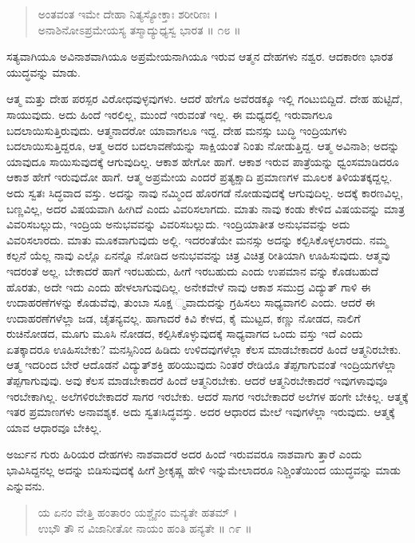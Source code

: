 \begin{verse}
ಅಂತವಂತ ಇಮೇ ದೇಹಾ ನಿತ್ಯಸ್ಯೋಕ್ತಾಃ ಶರೀರಿಣಃ ।\\ಅನಾಶಿನೋಽಪ್ರಮೇಯಸ್ಯ ತಸ್ಮಾದ್ಯುಧ್ಯಸ್ವ ಭಾರತ \num{॥ ೧೮ ॥}
\end{verse}

{\small ಸತ್ಯವಾಗಿಯೂ ಅವಿನಾಶವಾಗಿಯೂ ಅಪ್ರಮೇಯನಾಗಿಯೂ ಇರುವ ಆತ್ಮನ ದೇಹಗಳು ನಶ್ವರ. ಆದಕಾರಣ ಭಾರತ ಯುದ್ಧವನ್ನು ಮಾಡು.}

ಆತ್ಮ ಮತ್ತು ದೇಹ ಪರಸ್ಪರ ವಿರೋಧವುಳ್ಳವುಗಳು. ಆದರೆ ಹೇಗೊ ಅವೆರಡಕ್ಕೂ ಇಲ್ಲಿ ಗಂಟುಬಿದ್ದಿದೆ. ದೇಹ ಹುಟ್ಟಿದೆ, ಸಾಯುವುದು. ಅದು ಹಿಂದೆ ಇರಲಿಲ್ಲ, ಮುಂದೆ ಇರುವಂತೆ ಇಲ್ಲ. ಈ ಮಧ್ಯದಲ್ಲಿ ಇರುವಾಗಲೂ ಬದಲಾಯಿಸುತ್ತಿರುವುದು. ಆತ್ಮನಾದರೋ ಯಾವಾಗಲೂ ಇದ್ದ. ದೇಹ ಮನಸ್ಸು ಬುದ್ಧಿ ಇಂದ್ರಿಯಗಳು ಬದಲಾಯಿಸುತ್ತಿದ್ದರೂ, ಆತ್ಮ ಅದರ ಬದಲಾವಣೆಯನ್ನು ಸಾಕ್ಷಿಯಂತೆ ನಿಂತು ನೋಡುತ್ತಿದ್ದ. ಆತ್ಮ ಅವಿನಾಶಿ; ಅದನ್ನು ಯಾವುದೂ ಸಾಯಿಸುವುದಕ್ಕೆ ಆಗುವುದಿಲ್ಲ. ಆಕಾಶ ಹೇಗೋ ಹಾಗೆ. ಆಕಾಶ ಇರುವ ಪಾತ್ರೆಯನ್ನು ಧ್ವಂಸಮಾಡಿದರೂ ಆಕಾಶ ಹೇಗೆ ಇರುವುದೋ ಹಾಗೆ. ಆತ್ಮ ಅಪ್ರಮೇಯ ಎಂದರೆ ಪ್ರತ್ಯಕ್ಷಾದಿ ಪ್ರಮಾಣಗಳ ಮೂಲಕ ತಿಳಿಯತಕ್ಕದ್ದಲ್ಲ. ಅದು ಸ್ವತಃ ಸಿದ್ಧವಾದ ವಸ್ತು. ಅದನ್ನು ನಾವು ನಮ್ಮಿಂದ ಹೊರಗಡೆ ನೋಡುವುದಕ್ಕೆ ಆಗುವುದಿಲ್ಲ. ಅದಕ್ಕೆ ಕಾರಣವಿಲ್ಲ, ಬಣ್ಣವಿಲ್ಲ, ಅದರ ವಿಷಯವಾಗಿ ಹೀಗಿದೆ ಎಂದು ವಿವರಿಸಲಾಗದು. ಮಾತು ನಾವು ಕಂಡು ಕೇಳಿದ ವಿಷಯವನ್ನು ಮಾತ್ರ ವಿವರಿಸಬಲ್ಲುದು, ಇಂದ್ರಿಯ ಅನುಭವವನ್ನು ವಿವರಿಸಬಲ್ಲುದು. ಇಂದ್ರಿಯಾತೀತ ಅನುಭವವನ್ನು ಅದು ವಿವರಿಸಲಾರದು. ಮಾತು ಮೂಕವಾಗುವುದು ಅಲ್ಲಿ. ಇದರಂತೆಯೇ ಮನಸ್ಸು ಅದನ್ನು ಕಲ್ಪಿಸಿಕೊಳ್ಳಲಾರದು. ನಮ್ಮ ಕಲ್ಪನೆ ಯೆಲ್ಲ ನಾವು ಎಲ್ಲೊ ಏನನ್ನೊ ನೋಡಿದ ಅನುಭವವನ್ನು ಚಿತ್ರ ವಿಚಿತ್ರ ರೀತಿಯಾಗಿ ಊಹಿಸುವುದು. ಆತ್ಮವು ಇದರಂತೆ ಅಲ್ಲ. ಬೇಕಾದರೆ ಹಾಗೆ ಇರಬಹುದು, ಹೀಗೆ ಇರಬಹುದು ಎಂದು ಉಪಮಾನ ವನ್ನು ಕೊಡಬಹುದೆ ಹೊರತು, ಅದೇ ಇದು ಎಂದು ಹೇಳಲಾಗುವುದಿಲ್ಲ. ಅನೇಕವೇಳೆ ನಾವು ಆಕಾಶ ಸಮುದ್ರ ವಿದ್ಯುತ್ ಗಾಳಿ ಈ ಉದಾಹರಣೆಗಳನ್ನು ಕೊಡುವೆವು, ತುಂಬಾ ಸೂಕ್ಷ ್ಮವಾದುದನ್ನು ಗ್ರಹಿಸಲು ಸಾಧ್ಯವಾಗಲಿ ಎಂದು. ಆದರೆ ಈ ಉದಾಹರಣೆಗಳೆಲ್ಲಾ ಜಡ, ಚೈತನ್ಯವಲ್ಲ. ಹಾಗಾದರೆ ಕಿವಿ ಕೇಳದ, ಕೈ ಮುಟ್ಟದ, ಕಣ್ಣು ನೋಡದ, ನಾಲಿಗೆ ರುಚಿನೋಡದ, ಮೂಗು ಮೂಸಿ ನೋಡದ, ಕಲ್ಪಿಸಿಕೊಳ್ಳುವುದಕ್ಕೆ ಸಾಧ್ಯವಾಗದ ಒಂದು ವಸ್ತು ಇದೆ ಎಂದು ಏತಕ್ಕಾದರೂ ಊಹಿಸಬೇಕು? ಮನಸ್ಸಿನಿಂದ ಹಿಡಿದು ಉಳಿದವುಗಳೆಲ್ಲಾ ಕೆಲಸ ಮಾಡಬೇಕಾದರೆ ಹಿಂದೆ ಆತ್ಮನಿರಬೇಕು. ಆತ್ಮ ಇದರಿಂದ ಬೇರೆ ಆದೊಡನೆ ವಿದ್ಯುತ್​ಶಕ್ತಿ ಹರಿಯುವುದು ನಿಂತರೆ ರೇಡಿಯೊ ತೆಪ್ಪಗಾಗುವಂತೆ ಇಂದ್ರಿಯಗಳೆಲ್ಲಾ ತೆಪ್ಪಗಾಗುವುವು. ಅವು ಕೆಲಸ ಮಾಡಬೇಕಾದರೆ ಹಿಂದೆ ಆತ್ಮನಿರಬೇಕು. ಆದರೆ ಆತ್ಮನಿರಬೇಕಾದರೆ ಇವುಗಳಾವುವೂ ಇರಬೇಕಾಗಿಲ್ಲ. ಅಲೆಗಳಿರಬೇಕಾದರೆ ಸಾಗರ ಇರಬೇಕು. ಆದರೆ ಸಾಗರ ಇರಬೇಕಾದರೆ ಅಲೆಗಳ ಹಂಗೇ ಬೇಕಿಲ್ಲ. ಆತ್ಮಕ್ಕೆ ಇತರ ಪ್ರಮಾಣಗಳು ಅನಾವಶ್ಯಕ. ಅದು ಸ್ವತಃಸಿದ್ಧವಸ್ತು. ಅದರ ಆಧಾರದ ಮೇಲೆ ಇವುಗಳೆಲ್ಲಾ ಇರುವುದು. ಆತ್ಮಕ್ಕೆ ಯಾವ ಆಧಾರವೂ ಬೇಕಿಲ್ಲ.

ಅರ್ಜುನ ಗುರು ಹಿರಿಯರ ದೇಹಗಳು ನಾಶವಾದರೆ ಅದರ ಹಿಂದೆ ಇರುವವರೂ ನಾಶವಾಗು ತ್ತಾರೆ ಎಂದು ಭಾವಿಸಿದ್ದನಲ್ಲ ಅದನ್ನು ಬಿಡಿಸುವುದಕ್ಕೆ ಹೀಗೆ ಶ್ರೀಕೃಷ್ಣ ಹೇಳಿ ಇನ್ನುಮೇಲಾದರೂ ನಿಶ್ಚಿಂತೆಯಿಂದ ಯುದ್ಧವನ್ನು ಮಾಡು ಎನ್ನುವನು.

\begin{verse}
ಯ ಏನಂ ವೇತ್ತಿ ಹಂತಾರಂ ಯಶ್ಚೈನಂ ಮನ್ಯತೇ ಹತಮ್ ।\\ಉಭೌ ತೌ ನ ವಿಜಾನೀತೋ ನಾಯಂ ಹಂತಿ ಹನ್ಯತೇ \num{॥ ೧೯ ॥}
\end{verse}

